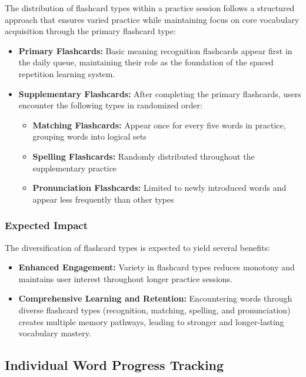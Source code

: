 The distribution of flashcard types within a practice session follows a structured approach that ensures varied practice while maintaining focus on core vocabulary acquisition through the primary flashcard type:

\begin{itemize}
    \item \textbf{Primary Flashcards:} Basic meaning recognition flashcards appear first in the daily queue, maintaining their role as the foundation of the spaced repetition learning system.
    
    \item \textbf{Supplementary Flashcards:} After completing the primary flashcards, users encounter the following types in randomized order:
    \begin{itemize}
        \item \textbf{Matching Flashcards:} Appear once for every five words in practice, grouping words into logical sets
        \item \textbf{Spelling Flashcards:} Randomly distributed throughout the supplementary practice
        \item \textbf{Pronunciation Flashcards:} Limited to newly introduced words and appear less frequently than other types
    \end{itemize}
\end{itemize}

\subsubsection{Expected Impact}

The diversification of flashcard types is expected to yield several benefits:

\begin{itemize}
    \item \textbf{Enhanced Engagement:} Variety in flashcard types reduces monotony and maintains user interest throughout longer practice sessions.
    
    \item \textbf{Comprehensive Learning and Retention:} Encountering words through diverse flashcard types (recognition, matching, spelling, and pronunciation) creates multiple memory pathways, leading to stronger and longer-lasting vocabulary mastery.
    
\end{itemize}

\subsection{Individual Word Progress Tracking}

